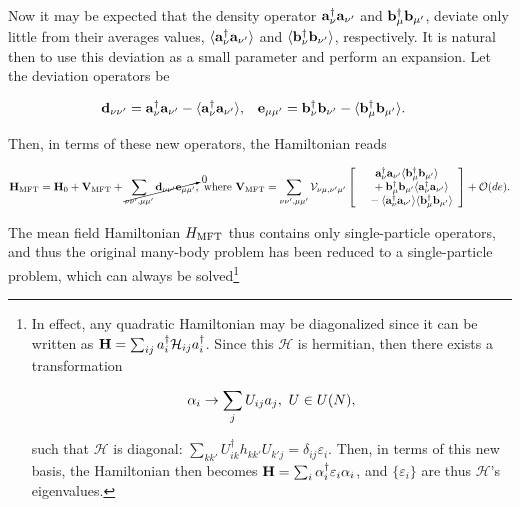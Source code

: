 Now it may be expected that the density operator ${\bf a}_{\nu}^\dagger {\bf a}_{\nu'}$ and ${\bf b}_{\mu}^\dagger {\bf b}_{\mu'}$, deviate only little from their averages values, $ \langle {\bf a}_{\nu}^\dagger {\bf a}_{\nu'} \rangle$ and  $ \langle {\bf b}_{\nu}^\dagger {\bf b}_{\nu'} \rangle$, respectively. It is natural then to use this deviation as a small parameter and perform an expansion. Let the deviation operators be 

\begin{align}
    {\bf d}_{\nu \nu'} &= {\bf a}_{\nu}^\dagger {\bf a}_{\nu'} - \langle {\bf a}_{\nu}^\dagger {\bf a}_{\nu'} \rangle, & {\bf e}_{\mu \mu'} &= {\bf b}_{\nu}^\dagger {\bf b}_{\nu'} - \langle {\bf b}_{\mu}^\dagger {\bf b}_{\mu'} \rangle.
\end{align}

Then, in terms of these new operators, the Hamiltonian reads

\begin{equation*}
    {\bf H}_{\textnormal{MFT}}  = {\bf H}_0 + {\bf V}_{\textnormal{MFT}} + \cancelto{0}{\sum_{\nu\nu', \mu\mu'} {\bf d}_{\nu \nu'} {\bf e}_{\mu \mu'}}, \textnormal{ where } {\bf V}_{\textnormal{MFT}} = \sum_{\nu\nu', \mu\mu'} {\mathcal V}_{\nu\mu, \nu'\mu'} \left[\begin{array}{c}
         {\bf a}_{\nu}^\dagger {\bf a}_{\nu'} \langle {\bf b}_{\mu}^\dagger {\bf b}_{\mu'} \rangle \\
         \textnormal{ } \textnormal{ } + {\bf b}_{\mu}^\dagger {\bf b}_{\mu'} \langle {\bf a}_{\nu}^\dagger {\bf a}_{\nu'} \rangle \\
         \textnormal{ } \textnormal{ } - \langle {\bf a}_{\nu}^\dagger {\bf a}_{\nu'} \rangle \langle {\bf b}_{\mu}^\dagger {\bf b}_{\mu'} \rangle  
    \end{array} \right] + \mathcal{O}(d e).
\end{equation*}

The mean field Hamiltonian $H_{\textnormal{MFT}}$ thus contains only single-particle operators, and thus the original many-body problem has been reduced to a single-particle problem, which can always be solved\footnote{In effect, any quadratic Hamiltonian may be diagonalized since it can be written as ${\bf H} = \sum_{ij} a_i^\dagger {\mathcal{H}}_{ij} a_i^\dagger$. Since this $\bm{ {\mathcal{H}}}$ is hermitian, then there exists a transformation

$$
    {\alpha}_i \rightarrow \sum_{j} U_{ij} a_j, \textnormal{ } U \in U(N),
$$

such that $\bm{ {\mathcal{H}}}$ is diagonal: $\sum_{kk'} U_{ik}^\dagger h_{kk'} U_{k'j} = \delta_{ij} \varepsilon_i$. Then, in terms of this new basis, the Hamiltonian then becomes ${\bf H} = \sum_{i} \alpha_i^\dagger \varepsilon_i \alpha_i$, and $\{\varepsilon_i\}$ are thus  $\bm{ {\mathcal{H}}}$'s eigenvalues.}

